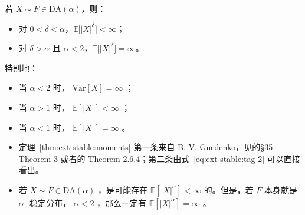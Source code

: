 \begin{theorem}[吸引域分布的矩]
\label{thm:ext-stable:moments}

若 $X\sim F \in \mathrm{DA}(\alpha)$，则：

\begin{itemize}
\tightlist
\item
  对 $0<\delta < \alpha$，$\mathbb E\big[|X|^\delta\big] < \infty$；
\item
  对 $\delta > \alpha$ 且 $\alpha < 2$，$\mathbb E\big[|X|^\delta\big] = \infty$。
\end{itemize}

特别地：

\begin{itemize}
\tightlist
\item
  当 $\alpha < 2$ 时， $\mathrm{Var}[X]=\infty$ ；
\item
  当 $\alpha > 1$ 时， $\mathbb{E}[|X|]<\infty$ ；
\item
  当 $\alpha < 1$ 时， $\mathbb{E}[|X|]=\infty$ 。
\end{itemize}

\end{theorem}

\begin{remark}

\begin{itemize}
\tightlist
\item
  定理~\ref{thm:ext-stable:moments} 第一条来自 B. V. Gnedenko，见\cite{gnedenko1954}的§35 Theorem 3 或者\cite{ibragimov1971}的 Theorem 2.6.4；第二条由式~\eqref{eq:ext-stable:tag-2} 可以直接看出。
\item
  若 $X\sim F\in\mathrm{DA}(\alpha)$ ，是可能存在 $\mathbb{E}[|X|^\alpha]<\infty$ 的。但是，若 $F$ 本身就是 $\alpha$ -稳定分布， $\alpha<2$ ，那么一定有 $\mathbb{E}[|X|^\alpha]=\infty$ 。
\end{itemize}
\end{remark}

